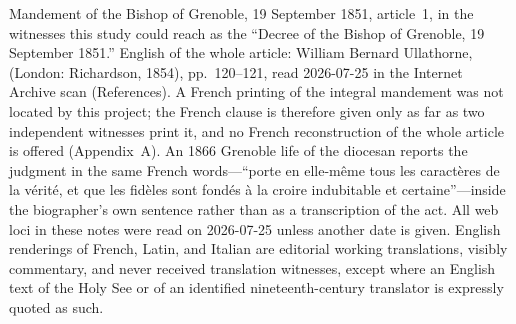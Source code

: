 \begin{operativetext}{Mandement of the Bishop of Grenoble, 19
September 1851, article~1, in the witnesses this study could reach}
{as the ``Decree of the Bishop of Grenoble, 19 September 1851.''
English of the whole article: William Bernard Ullathorne,  (London:
Richardson, 1854), pp.~120--121, read 2026-07-25 in the Internet
Archive scan (References). A French printing of the integral
mandement was not located by this project; the French clause is
therefore given only as far as two independent witnesses print it,
and no French reconstruction of the whole article is offered
(Appendix~A). An 1866 Grenoble life of the diocesan
 reports the judgment in the same French
words---``porte en elle-même tous les caractères de la vérité, et que les
fidèles sont fondés à la croire indubitable et certaine''---inside
the biographer's own sentence rather than as a transcription of the
act. All web loci in these notes were read on 2026-07-25 unless
another date is given. English renderings of French, Latin, and
Italian are editorial working translations, visibly commentary, and
never received translation witnesses, except where an English text
of the Holy See or of an identified nineteenth-century translator is
expressly quoted as such.}
\end{operativetext}

